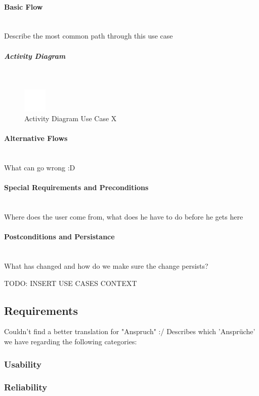 \paragraph*{Basic Flow} \mbox{}\\

Describe the most common path through this use case

\subparagraph{Activity Diagram}\mbox{}\\
\begin{figure}[h]
	\centering
	\includegraphics[width=0.1\textwidth]{Content/Domain/placeholder.png}
	\caption{Activity Diagram Use Case X}
	\label{fig:label12}
\end{figure}

\paragraph*{Alternative Flows}\mbox{}\\
What can go wrong :D

\paragraph*{Special Requirements and Preconditions}\mbox{}\\
Where does the user come from, what does he have to do before he gets here

\paragraph*{Postconditions and Persistance}\mbox{}\\
What has changed and how do we make sure the change persists?

TODO: INSERT USE CASES CONTEXT

\subsection{Requirements}
\label{sec:domainBc}
Couldn't find a better translation for "Anspruch" :/
Describes which 'Ansprüche' we have regarding the following categories:
\subsubsection{Usability}
\label{sec:domainBca}
\subsubsection{Reliability}
\label{sec:domainBcb}
